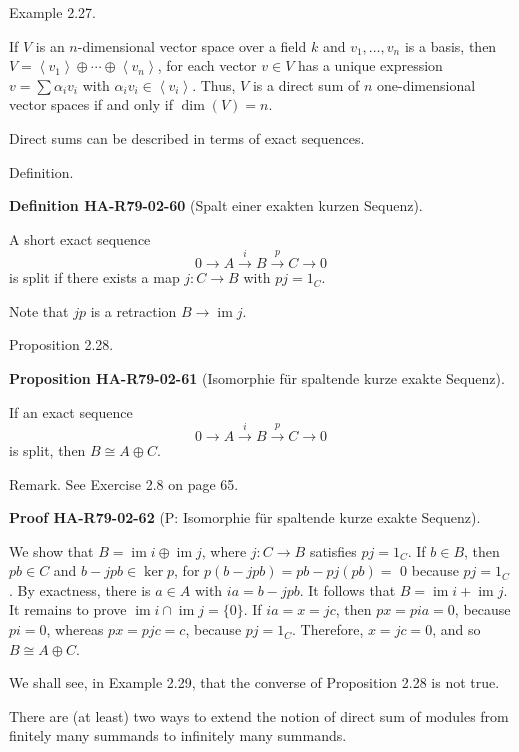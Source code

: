 \documentclass[10pt, letterpaper]{article}
\newcommand{\CustomHeading}[3]{%
  \par\medskip\noindent%
  \textbf{#1 #2} \textnormal{(#3)}.\enskip%
}
\newenvironment{DEF}[2]{\begin{unitbox}\CustomHeading{Definition}{#1}{#2}}{\end{unitbox}}
\newenvironment{PROP}[2]{\begin{unitbox}\CustomHeading{Proposition}{#1}{#2}}{\end{unitbox}}
\newenvironment{PROOF}[2]{\begin{unitbox}\CustomHeading{Proof}{#1}{#2}}{\end{unitbox}}
\begin{document}
Example 2.27. 

If $V$ is an $n$-dimensional vector space over a field $k$ and $v_{1}, \ldots, v_{n}$ is a basis, then $V=\left\langle v_{1}\right\rangle \oplus \cdots \oplus\left\langle v_{n}\right\rangle$, for each vector $v \in V$ has a unique expression $v=\sum \alpha_{i} v_{i}$ with $\alpha_{i} v_{i} \in\left\langle v_{i}\right\rangle$. Thus, $V$ is a direct sum of $n$ one-dimensional vector spaces if and only if $\operatorname{dim}(V)=n$.

Direct sums can be described in terms of exact sequences.


Definition. 


\begin{DEF}{HA-R79-02-60}{Spalt einer exakten kurzen Sequenz}
A short exact sequence
$$
0 \rightarrow A \xrightarrow{i} B \xrightarrow{p} C \rightarrow 0
$$
is split if there exists a map $j: C \rightarrow B$ with $p j=1_{C}$.

Note that $j p$ is a retraction $B \rightarrow \operatorname{im} j$.
\end{DEF}


Proposition 2.28. 

\begin{PROP}{HA-R79-02-61}{Isomorphie für spaltende kurze exakte Sequenz}
If an exact sequence
$$
0 \rightarrow A \xrightarrow{i} B \xrightarrow{p} C \rightarrow 0
$$
is split, then $B \cong A \oplus C$.
\end{PROP}

Remark. See Exercise 2.8 on page 65.


\begin{PROOF}{HA-R79-02-62}{P: Isomorphie für spaltende kurze exakte Sequenz}
We show that $B=\operatorname{im} i \oplus \operatorname{im} j$, where $j: C \rightarrow B$ satisfies $p j=1_{C}$. If $b \in B$, then $p b \in C$ and $b-j p b \in \operatorname{ker} p$, for $p(b-j p b)=p b-p j(p b)=$ 0 because $p j=1_{C}$. By exactness, there is $a \in A$ with $i a=b-j p b$. It follows that $B=\operatorname{im} i+\operatorname{im} j$. It remains to prove $\operatorname{im} i \cap \operatorname{im} j=\{0\}$. If $i a=x=j c$, then $p x=p i a=0$, because $p i=0$, whereas $p x=p j c=c$, because $p j=1_{C}$. Therefore, $x=j c=0$, and so $B \cong A \oplus C$.
\end{PROOF}

We shall see, in Example 2.29, that the converse of Proposition 2.28 is not true.



There are (at least) two ways to extend the notion of direct sum of modules from finitely many summands to infinitely many summands.
\end{document}
